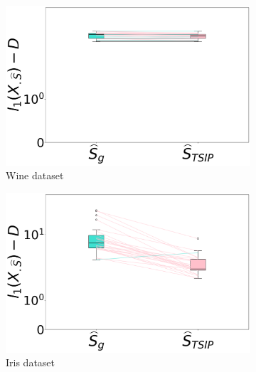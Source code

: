 \begin{figure}[t]
    \centering
    \begin{subfigure}[b]{0.3\textwidth}
        \centering
        \includegraphics[width=\textwidth]{../figures/wine_standardized_0p5_1p0_isometry_losses}
        \caption{Wine dataset}
        \label{fig:wine_isometry_losses}
    \end{subfigure}
    \hfill
    \begin{subfigure}[b]{0.3\textwidth}
        \centering
        \includegraphics[width=\textwidth]{../figures/iris_standardized_0p5_1p0_isometry_losses}
        \caption{Iris dataset}
        \label{fig:iris_isometry_losses}
    \end{subfigure}
    \hfill
    \begin{subfigure}[b]{0.3\textwidth}
        \centering

\end{subfigure}
\end{figure}
